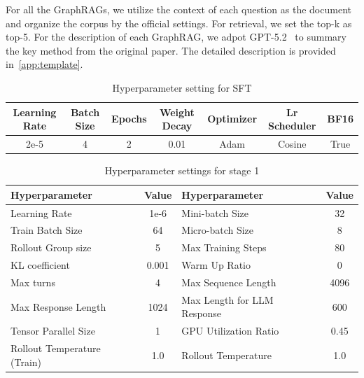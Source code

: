 For all the GraphRAGs, we utilize the context of each question as the document and organize the corpus by the official settings. For retrieval, we set the top-k as top-5. For the description of each GraphRAG, we adpot GPT-5.2~\cite{GPT5} to summary the key method from the original paper. The detailed description is provided in~\ref{app:template}.
\begin{table}[!h]
\centering
\begin{tabular}{ccccccc}
\toprule
\textbf{Learning Rate} & \textbf{Batch Size} & \textbf{Epochs} & \textbf{Weight Decay} & \textbf{Optimizer} & \textbf{Lr Scheduler} & \textbf{BF16} \\ \hline
2e-5          & 4          & 2      & 0.01         & Adam      & Cosine       & True \\ \bottomrule
\end{tabular}
\caption{Hyperparameter setting for SFT}
\label{tab:hyperSFT}
\end{table}

\begin{table}[!h]
\centering
\large
\renewcommand{\arraystretch}{1.2}
\setlength{\tabcolsep}{12pt}

\begin{tabular}{p{5.5cm} c p{5.5cm} c}
\toprule
\textbf{Hyperparameter} & \textbf{Value} & \textbf{Hyperparameter} & \textbf{Value} \\
\midrule
Learning Rate & 1e-6 & Mini-batch Size & 32  \\
Train Batch Size & 64 & Micro-batch Size & 8 \\
Rollout Group size & 5 & Max Training Steps & 80 \\
KL coefficient & 0.001 & Warm Up Ratio & 0 \\
Max turns & 4 & Max Sequence Length & 4096 \\
Max Response Length & 1024 & Max Length for LLM Response & 600 \\
Tensor Parallel Size & 1 & GPU Utilization Ratio & 0.45 \\
Rollout Temperature (Train) & 1.0 & Rollout Temperature & 1.0 \\
\bottomrule
\end{tabular}
\caption{Hyperparameter settings for stage 1}
\label{tab:hyper_stage1}
\end{table}


